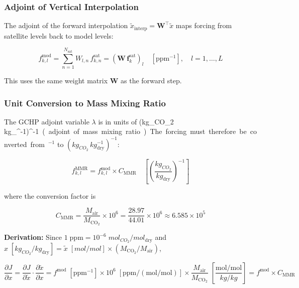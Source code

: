 \documentclass[12pt]{article}
\newcommand{\mmr}{\mathrm{MMR}}
\begin{document}
\subsubsection{Adjoint of Vertical Interpolation}

The adjoint of the forward interpolation $\tilde{x}_{\mathrm{interp}} = \mathbf{W}^\top \tilde{x}$ maps forcing from satellite levels back to model levels:

\begin{equation}
  f_{k,l}^{\mathrm{mod}} = \sum_{n=1}^{N_{\mathrm{sat}}} W_{l,n}\,f_{k,n}^{\mathrm{sat}}
  = \left(\mathbf{W}\, \mathbf{f}_k^{\mathrm{sat}}\right)_l
  \quad [\text{ppm}^{-1}], \quad l = 1, \ldots, L
  \label{eq:force_model}
\end{equation}

This uses the same weight matrix $\mathbf{W}$ as the forward step.

\subsubsection{Unit Conversion to Mass Mixing Ratio}

The GCHP adjoint variable $\lambda$ is in units of
\si{(kg_{CO_2}\,kg_{}^{-1})^{-1}}
(adjoint of mass mixing ratio). The forcing must therefore be converted
from $^{-1}$ to $(\si{kg_{CO_2}\,kg_{\mathrm{dry}}^{-1}})^{-1}$:

\begin{equation}
  f_{k,l}^{\mmr} = f_{k,l}^{\mathrm{mod}} \times C_{\mathrm{MMR}}
  \quad \left[\left(\frac{\si{kg_{CO_2}}}{\si{kg_{\mathrm{dry}}}}\right)^{-1}\right]
  \label{eq:force_mmr}
\end{equation}

where the conversion factor is

\begin{equation}
  C_{\mathrm{MMR}} = \frac{M_{\mathrm{air}}}{M_{\mathrm{CO}_2}} \times 10^6
  = \frac{28.97}{44.01} \times 10^6 \approx 6.585 \times 10^5
  \label{eq:Cmmr}
\end{equation}

\textbf{Derivation:} Since $1\;\text{ppm} = 10^{-6}\;\si{mol_{CO_2}/mol_{\mathrm{dry}}}$
and
$x\;[\si{kg_{CO_2}/kg_{\mathrm{dry}}}] = \tilde{x}\;[\si{mol/mol}] \times (M_{\mathrm{CO}_2}/M_{\mathrm{air}})$,

\begin{equation}
  \frac{\partial J}{\partial x} = \frac{\partial J}{\partial \tilde{x}} \cdot
  \frac{\partial \tilde{x}}{\partial x}
  = f^{\mathrm{mod}}\;[\text{ppm}^{-1}] \times 10^6\;[\text{ppm}/(\text{mol/mol})]
    \times \frac{M_{\mathrm{air}}}{M_{\mathrm{CO}_2}}\;\left[\frac{\text{mol/mol}}{\si{kg/kg}}\right]
  = f^{\mathrm{mod}} \times C_{\mathrm{MMR}}
\end{equation}
\end{document}
